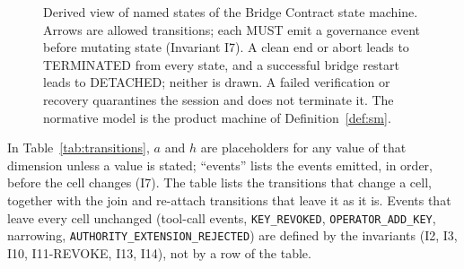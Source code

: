 \begin{figure}[t]
\centering
\resizebox{\columnwidth}{!}{}
\caption{Derived view of named states of the Bridge Contract state machine.
Arrows are allowed transitions; each MUST emit a governance event before
mutating state (Invariant I7). A clean end or abort leads to TERMINATED from
every state, and a successful bridge restart leads to DETACHED; neither is
drawn. A failed verification or recovery quarantines the session and does not
terminate it. The normative model is the product machine of
Definition~\ref{def:sm}.}\label{fig:state-machine}
\end{figure}

In Table~\ref{tab:transitions}, $a$ and $h$ are placeholders for any
value of that dimension unless a value is stated; ``events'' lists the
events emitted, in order, before the cell changes (I7). The table lists
the transitions that change a cell, together with the join and re-attach
transitions that leave it as it is. Events that leave every cell
unchanged (tool-call events, \texttt{KEY\_REVOKED},
\texttt{OPERATOR\_ADD\_KEY}, narrowing, \texttt{AUTHORITY\_EXTENSION\_REJECTED})
are defined by the invariants (I2, I3, I10, I11-REVOKE, I13, I14), not by
a row of the table.


